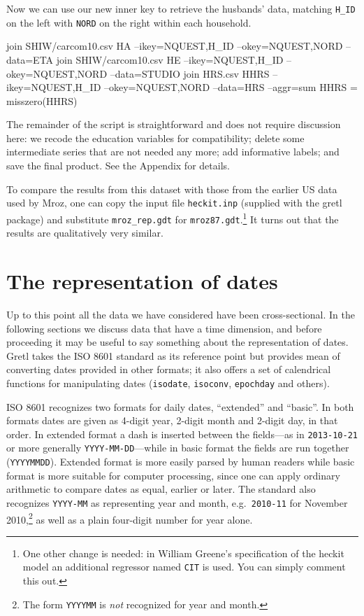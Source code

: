 %
Now we can use our new inner key to retrieve the husbands' data,
matching \verb|H_ID| on the left with \texttt{NORD} on the right
within each household.
%
\begin{code}
join SHIW/carcom10.csv HA --ikey=NQUEST,H_ID --okey=NQUEST,NORD --data=ETA
join SHIW/carcom10.csv HE --ikey=NQUEST,H_ID --okey=NQUEST,NORD --data=STUDIO
join HRS.csv HHRS --ikey=NQUEST,H_ID --okey=NQUEST,NORD --data=HRS --aggr=sum
HHRS = misszero(HHRS)
\end{code}
%
The remainder of the script is straightforward and does not require
discussion here: we recode the education variables for compatibility;
delete some intermediate series that are not needed any more; add
informative labels; and save the final product. See the Appendix for
details.

To compare the results from this dataset with those from the earlier
US data used by Mroz, one can copy the input file \texttt{heckit.inp}
(supplied with the gretl package) and substitute \verb|mroz_rep.gdt|
for \texttt{mroz87.gdt}.\footnote{One other change is needed: in
  William Greene's specification of the heckit model an additional
  regressor named \texttt{CIT} is used. You can simply comment this
  out.} It turns out that the results are qualitatively very similar.

\section{The representation of dates}
\label{sec:join-isodates}

Up to this point all the data we have considered have been
cross-sectional. In the following sections we discuss data that have a
time dimension, and before proceeding it may be useful to say
something about the representation of dates. Gretl takes the ISO 8601
standard as its reference point but provides mean of converting dates
provided in other formats; it also offers a set of calendrical
functions for manipulating dates (\texttt{isodate}, \texttt{isoconv},
\texttt{epochday} and others).

ISO 8601 recognizes two formats for daily dates, ``extended'' and
``basic''. In both formats dates are given as 4-digit year, 2-digit
month and 2-digit day, in that order. In extended format a dash is
inserted between the fields---as in \texttt{2013-10-21} or more
generally \texttt{YYYY-MM-DD}---while in basic format the fields are
run together (\texttt{YYYYMMDD}). Extended format is more easily
parsed by human readers while basic format is more suitable for
computer processing, since one can apply ordinary arithmetic to
compare dates as equal, earlier or later.  The standard also
recognizes \texttt{YYYY-MM} as representing year and month, e.g.\
\texttt{2010-11} for November 2010,\footnote{The form \texttt{YYYYMM}
  is \textit{not} recognized for year and month.} as well as
a plain four-digit number for year alone.


